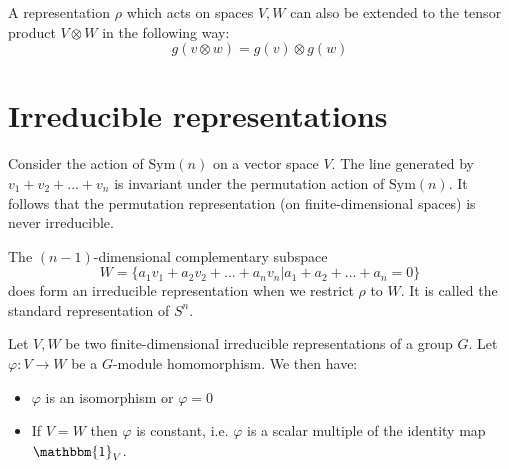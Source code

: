         \begin{example}
        	A representation $\rho$ which acts on spaces $V, W$ can also be extended to the tensor product  $V\otimes W$ in the following way:
            \begin{equation}
            	g(v\otimes w) = g(v)\otimes g(w)
            \end{equation}
        \end{example}

\section{Irreducible representations}

	
	\begin{example}
		Consider the action of $\text{Sym}(n)$ on a vector space $V$. The line generated by $v_1+v_2+...+v_n$ is invariant under the permutation action of $\text{Sym}(n)$. It follows that the permutation representation (on finite-dimensional spaces) is never irreducible.
		
		The $(n-1)$-dimensional complementary subspace
		\begin{equation}
			W = \{a_1v_1 + a_2v_2 + ... + a_nv_n|a_1 + a_2 + ... + a_n = 0\}
		\end{equation}
		does form an irreducible representation when we restrict $\rho$ to $W$. It is called the standard representation of $S^n$.
	\end{example}
        
        \begin{theorem}\label{rep:schurs_lemma}
        	Let $V, W$ be two finite-dimensional irreducible representations of a group $G$. Let $\varphi: V\rightarrow W$ be a $G$-module homomorphism. We then have:
            	\begin{itemize}
	        	\item $\varphi$ is an isomorphism or $\varphi = 0$
	                \item If $V = W$ then $\varphi$ is constant, i.e. $\varphi$ is a scalar multiple of the identity map $\mathbbm{1}_V$.
        	\end{itemize}
        \end{theorem}
        
